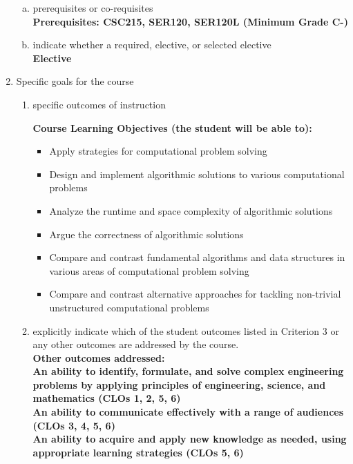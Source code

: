 \begin{enumerate}[1.]
\begin{enumerate}[a.]
\item prerequisites or co-requisites\\
  {\bfseries
    Prerequisites: CSC215, SER120, SER120L (Minimum Grade C-) \\  %
  }

\item indicate whether a required, elective, or selected elective\\ %
  {\bfseries
    Elective
  }

\end{enumerate}

\item Specific goals for the course
\begin{enumerate}
\item specific outcomes of instruction\\ %
  {\bfseries
    Course Learning Objectives (the student will be able to):
    \begin{itemize}
      \item Apply strategies for computational problem solving
      \item Design and implement algorithmic solutions to various computational problems
      \item Analyze the runtime and space complexity of algorithmic solutions
      \item Argue the correctness of algorithmic solutions
      \item Compare and contrast fundamental algorithms and data structures in various areas of computational problem solving
      \item Compare and contrast alternative approaches for tackling non-trivial unstructured computational problems
    \end{itemize}
  }

\item explicitly indicate which of the student outcomes listed in Criterion 3 or any other outcomes are addressed by the course.\\
  {\bfseries
    Other outcomes addressed:\\
    An ability to identify, formulate, and solve complex engineering problems by applying principles of engineering, science, and mathematics (CLOs 1, 2, 5, 6)\\
    An ability to communicate effectively with a range of audiences (CLOs 3, 4, 5, 6) \\
    An ability to acquire and apply new knowledge as needed, using appropriate learning strategies (CLOs 5, 6)
  }
\end{enumerate}


\end{enumerate}
